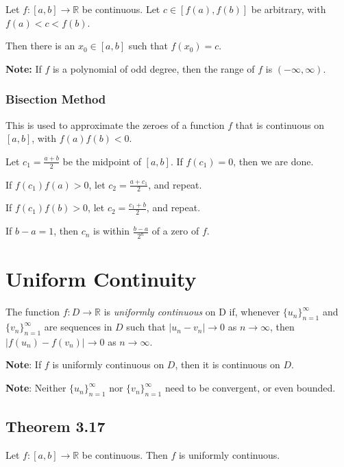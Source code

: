 \documentclass[12pt,letterpaper]{article}
\newcommand{\R}{{\mathbb R}}
\begin{document}
\begin{multicols*}{2}
        Let $f: [a, b] \rightarrow \R$ be continuous. Let $c \in [f(a), f(b)]$
        be arbitrary, with $f(a) < c < f(b)$.

        Then there is an $x_0 \in [a, b]$ such that $f(x_0) = c$.

        {\bf Note:} If $f$ is a polynomial of odd degree, then the range of $f$
        is $(-\infty, \infty)$.

        \subsubsection{Bisection Method}

        This is used to approximate the zeroes of a function $f$ that is
        continuous on $[a, b]$, with $f(a)f(b) < 0$.

        Let $c_1 = \frac{a + b}{2}$ be the midpoint of $[a, b]$. If $f(c_1) =
        0$, then we are done.

        If $f(c_1)f(a) > 0$, let $c_2 = \frac{a + c_1}{2}$, and repeat.

        If $f(c_1)f(b) > 0$, let $c_2 = \frac{c_1 + b}{2}$, and repeat.

        If $b - a = 1$, then $c_n$ is within $\frac{b - a}{2^n}$ of a zero of
        $f$.

        \section{Uniform Continuity}

        The function $f: D \rightarrow \R$ is {\it uniformly continuous} on D
        if, whenever $\{u_n\}_{n = 1}^{\infty}$ and $\{v_n\}_{n = 1}^{\infty}$
        are sequences in $D$ such that $|u_n - v_n| \rightarrow 0$ as $n
        \rightarrow \infty$, then $|f(u_n) - f(v_n)| \rightarrow 0$ as $n
        \rightarrow \infty$.

        {\bf Note}: If $f$ is uniformly continuous on $D$, then it is continuous
        on $D$.

        {\bf Note}: Neither $\{u_n\}_{n = 1}^{\infty}$ nor $\{v_n\}_{n =
        1}^{\infty}$ need to be convergent, or even bounded.


        \subsection{Theorem 3.17}

        Let $f: [a, b] \rightarrow \R$ be continuous. Then $f$ is uniformly
        continuous.


\end{multicols*}
\end{document}
